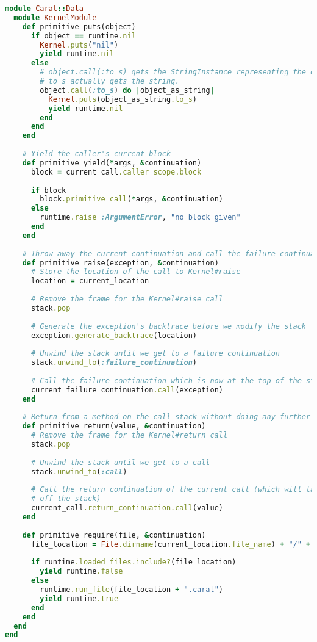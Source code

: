 \begin{lstlisting}[title={\small\ttfamily\bfseries data/kernel.rb},language=Ruby]
module Carat::Data
  module KernelModule
    def primitive_puts(object)
      if object == runtime.nil
        Kernel.puts("nil")
        yield runtime.nil
      else
        # object.call(:to_s) gets the StringInstance representing the object, and then calling
        # to_s actually gets the string.
        object.call(:to_s) do |object_as_string|
          Kernel.puts(object_as_string.to_s)
          yield runtime.nil
        end
      end
    end
    
    # Yield the caller's current block
    def primitive_yield(*args, &continuation)
      block = current_call.caller_scope.block
      
      if block
        block.primitive_call(*args, &continuation)
      else
        runtime.raise :ArgumentError, "no block given"
      end
    end
    
    # Throw away the current continuation and call the failure continuation
    def primitive_raise(exception, &continuation)
      # Store the location of the call to Kernel#raise
      location = current_location
      
      # Remove the frame for the Kernel#raise call
      stack.pop
      
      # Generate the exception's backtrace before we modify the stack
      exception.generate_backtrace(location)
      
      # Unwind the stack until we get to a failure continuation
      stack.unwind_to(:failure_continuation)
      
      # Call the failure continuation which is now at the top of the stack
      current_failure_continuation.call(exception)
    end
    
    # Return from a method on the call stack without doing any further computation
    def primitive_return(value, &continuation)
      # Remove the frame for the Kernel#return call
      stack.pop
      
      # Unwind the stack until we get to a call
      stack.unwind_to(:call)
      
      # Call the return continuation of the current call (which will take care of popping the call
      # off the stack)
      current_call.return_continuation.call(value)
    end
    
    def primitive_require(file, &continuation)
      file_location = File.dirname(current_location.file_name) + "/" + file.to_s
      
      if runtime.loaded_files.include?(file_location)
        yield runtime.false
      else
        runtime.run_file(file_location + ".carat")
        yield runtime.true
      end
    end
  end
end

\end{lstlisting}
